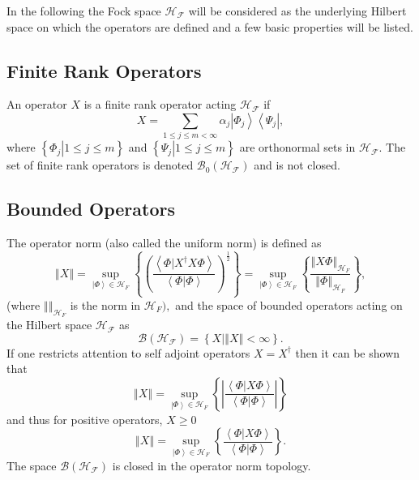 \documentclass[aps,preprint]{revtex4}%
\begin{document}
In the following the Fock space $\mathcal{H}_{\mathcal{F}}$ will be considered
as the underlying Hilbert space on which the operators are defined and a few
basic properties will be listed.

\subsection{Finite Rank Operators}

An operator $X$ is a finite rank operator acting $\mathcal{H}_{\mathcal{F}}$
if
\begin{equation}
X=\sum_{1\leq j\leq m<\infty}\alpha_{j}\left\vert \Phi_{j}\right\rangle
\left\langle \Psi_{j}\right\vert ,
\end{equation}
where $\left\{  \left.  \Phi_{j}\right\vert 1\leq j\leq m\right\}  $ and
$\left\{  \left.  \Psi_{j}\right\vert 1\leq j\leq m\right\}  $ are orthonormal
sets in $\mathcal{H}_{\mathcal{F}}.$ The set of finite rank operators is
denoted $\mathcal{B}_{0}\left(  \mathcal{H}_{\mathcal{F}}\right)  $ and is not closed.

\subsection{Bounded Operators}

The operator norm (also called the uniform norm) is defined as
\begin{equation}
\left\Vert X\right\Vert =\sup_{\left\vert \Phi\right\rangle \in\mathcal{H}%
_{F}}\left\{  \left(  \frac{\left\langle \left.  \Phi\right\vert X^{\dagger
}X\Phi\right\rangle }{\left\langle \left.  \Phi\right\vert \Phi\right\rangle
}\right)  ^{\frac{1}{2}}\right\}  =\sup_{\left\vert \Phi\right\rangle
\in\mathcal{H}_{F}}\left\{  \frac{\left\Vert X\Phi\right\Vert _{\mathcal{H}%
_{F}}}{\left\Vert \Phi\right\Vert _{\mathcal{H}_{F}}}\right\}  ,
\end{equation}
(where $\left\Vert {}\right\Vert _{\mathcal{H}_{F}}$ is the norm in
$\mathcal{H}_{F}),$ and the space of bounded operators acting on the Hilbert
space $\mathcal{H}_{\mathcal{F}}$ as
\begin{equation}
\mathcal{B}\left(  \mathcal{H}_{\mathcal{F}}\right)  =\left\{  X\left\vert
\left\Vert X\right\Vert <\infty\right.  \right\}  .
\end{equation}
If one restricts attention to self adjoint operators $X=X^{\dagger}$ then it
can be shown that
\begin{equation}
\left\Vert X\right\Vert =\sup_{\left\vert \Phi\right\rangle \in\mathcal{H}%
_{F}}\left\{  \left\vert \frac{\left\langle \left.  \Phi\right\vert
X\Phi\right\rangle }{\left\langle \left.  \Phi\right\vert \Phi\right\rangle
}\right\vert \right\}
\end{equation}
and thus for positive operators, $X\geq0$%
\begin{equation}
\left\Vert X\right\Vert =\sup_{\left\vert \Phi\right\rangle \in\mathcal{H}%
_{F}}\left\{  \frac{\left\langle \left.  \Phi\right\vert X\Phi\right\rangle
}{\left\langle \left.  \Phi\right\vert \Phi\right\rangle }\right\}  .
\end{equation}
The space $\mathcal{B}\left(  \mathcal{H}_{\mathcal{F}}\right)  $ is closed in
the operator norm topology.
\end{document}
